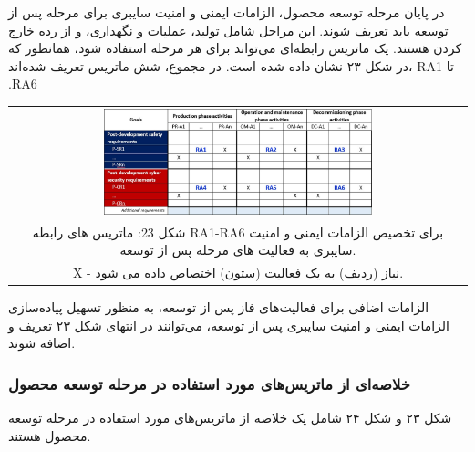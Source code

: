 \documentclass[a4paper,10pt]{article}
\begin{document}
                در پایان مرحله توسعه محصول، الزامات ایمنی و امنیت سایبری برای مرحله پس از توسعه باید تعریف شوند. این مراحل شامل تولید، عملیات و نگهداری، و از رده خارج کردن هستند. یک ماتریس رابطه‌ای می‌تواند برای هر مرحله استفاده شود، همانطور که در شکل ۲۳ نشان داده شده است. در مجموع، شش ماتریس تعریف شده‌اند، RA1 تا .RA6

                \begin{table}
            
                    \centering
                    \begin{tabular}{ c }
                        
                        \includegraphics[width=0.6\textwidth]{Image/fig23.jpg} \\
        
                        شکل 23: ماتریس های رابطه RA1-RA6 برای تخصیص الزامات ایمنی و امنیت سایبری به فعالیت های مرحله پس از توسعه.\\

                        X - نیاز (ردیف) به یک فعالیت (ستون) اختصاص داده می شود.
                        
                    \end{tabular}
        
                \end{table}

                الزامات اضافی برای فعالیت‌های فاز پس از توسعه، به منظور تسهیل پیاده‌سازی الزامات ایمنی و امنیت سایبری پس از توسعه، می‌توانند در انتهای شکل ۲۳ تعریف و اضافه شوند.

            \subsubsection{خلاصه‌ای از ماتریس‌های مورد استفاده در مرحله توسعه محصول}

                شکل ۲۳ و شکل ۲۴ شامل یک خلاصه از ماتریس‌های مورد استفاده در مرحله توسعه محصول هستند.
\end{document}
